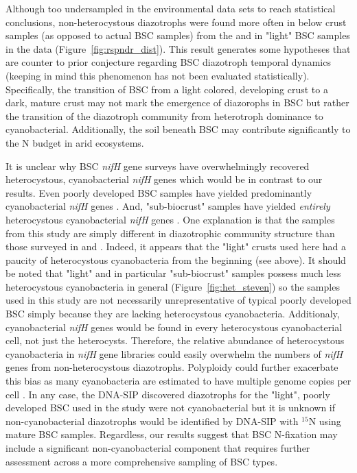 Although too undersampled in the environmental data sets to reach statistical
conclusions, non-heterocystous diazotrophs were found more often in below crust
samples (as opposed to actual BSC samples) from the \citet{Steven_2013} and in
"light" BSC samples in the \citet{Garcia_Pichel_2013} data
(Figure~\ref{fig:rspndr_dist}). This result generates some hypotheses that are
counter to prior conjecture regarding BSC diazotroph temporal dynamics (keeping
in mind this phenomenon has not been evaluated statistically). Specifically,
the transition of BSC from a light colored, developing crust to a dark, mature
crust may not mark the emergence of diazorophs in BSC but rather the transition
of the diazotroph community from heterotroph dominance to cyanobacterial.
Additionally, the soil beneath BSC may contribute significantly to the N budget
in arid ecosystems.

It is unclear why BSC \textit{nifH} gene surveys have overwhelmingly recovered
heterocystous, cyanobacterial \textit{nifH} genes which would be in contrast to
our results. Even poorly developed BSC samples have yielded predominantly
cyanobacterial \textit{nifH} genes \citep{14766579}. And, "sub-biocrust"
samples have yielded \textit{entirely} heterocystous cyanobacterial
\textit{nifH} genes \citep{Yeager_2012}. One explanation is that the samples
from this study are simply different in diazotrophic community structure than
those surveyed in \citet{Yeager} \citet{14766579} and \citet{Yeager_2012}.
Indeed, it appears that the "light" crusts used here had a paucity of
heterocystous cyanobacteria from the beginning (see above). It should be noted
that "light" and in particular "sub-biocrust" samples possess much less
heterocystous cyanobacteria in general (Figure~\ref{fig:het_steven}) so the
samples used in this study are not necessarily unrepresentative of typical
poorly developed BSC simply because they are lacking heterocystous
cyanobacteria. Additionaly, cyanobacterial \textit{nifH} genes would be found
in every heterocystous cyanobacterial cell, not just the
heterocysts. Therefore, the relative abundance of heterocystous cyanobacteria
in \textit{nifH} gene libraries could easily overwhelm the numbers of
\textit{nifH} genes from non-heterocystous diazotrophs. Polyploidy could
further exacerbate this bias as many cyanobacteria are estimated to have
multiple genome copies per cell \citep{Griese_2011}. In any case, the DNA-SIP
discovered diazotrophs for the "light", poorly developed BSC used in the study
were not cyanobacterial but it is unknown if non-cyanobacterial diazotrophs
would be identified by DNA-SIP with $^{15}$N using mature BSC samples.
Regardless, our results suggest that BSC N-fixation may include a significant
non-cyanobacterial component that requires further assessment across a more
comprehensive sampling of BSC types.

